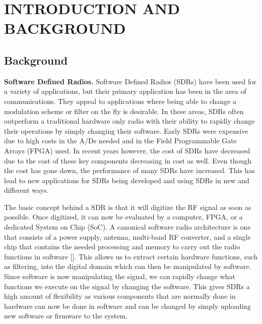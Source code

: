\chapter{INTRODUCTION AND  BACKGROUND}



\section{Background}
\textbf{Software Defined Radios.} Software Defined Radios (SDRs) have been used for a variety of applications, but their primary application has been in the area of communications.  They appeal to applications where being able to change a modulation scheme or filter on the fly is desirable.  In these areas, SDRs often outperform a traditional hardware only radio with their ability to rapidly change their operations by simply changing their software.  Early SDRs were expensive due to high costs in the A/Ds needed and in the Field Programmable Gate Arrays (FPGA) used.  In recent years however, the cost of SDRs have decreased due to the cost of these key components decreasing in cost as well.  Even though the cost has gone down, the performance of many SDRs have increased.  This has lead to new applications for SDRs being developed and using SDRs in new and different ways.

The basic concept behind a SDR is that it will digitize the RF signal as soon as possible.  Once digitized, it can now be evaluated by a computer, FPGA, or a dedicated System on Chip (SoC).  A canonical software radio architecture is one that consists of a power supply, antenna, multi-band RF converter, and a single chip that contains the needed processing and memory to carry out the radio functions in software [\cite{Mitola1995}]. This allows us to extract certain hardware functions, such as filtering, into the digital domain which can then be manipulated by software.  Since software is now manipulating the signal, we can rapidly change what functions we execute on the signal by changing the software.  This gives SDRs a high amount of flexibility as various components that are normally done in hardware can now be done in software and can be changed by simply uploading new software or firmware to the system.  

